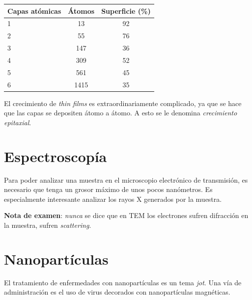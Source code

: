 \documentclass{tufte-book}
\begin{document}
\begin{margintable}
  \begin{tabular}{lcc}
    \toprule
    Capas atómicas & Átomos & Superficie (\%) \\
    \midrule
    1              & 13     & 92               \\
    2              & 55     & 76               \\
    3              & 147    & 36               \\
    4              & 309    & 52               \\
    5              & 561    & 45               \\
    6              & 1415   & 35               \\
    \bottomrule
  \end{tabular}
\end{margintable}

El crecimiento de \textit{thin films} es extraordinariamente
complicado, ya que se hace que las capas se depositen átomo a átomo. A
esto se le denomina \emph{crecimiento epitaxial}.


\section{Espectroscopía}
Para poder analizar una muestra en el microscopio electrónico de
transmisión, es necesario que tenga un grosor máximo de unos pocos
nanómetros. Es especialmente interesante analizar los rayos X
generados por la muestra.

\begin{flushleft}
  \textbf{Nota de examen}: \emph{nunca} se dice que en TEM los
  electrones sufren difracción en la muestra, sufren \emph{scattering}.
\end{flushleft}



\section{Nanopartículas}
El tratamiento de enfermedades con nanopartículas es un tema
\textit{jot}. Una vía de administración es el uso de virus decorados
con nanopartículas magnéticas.
\end{document}
